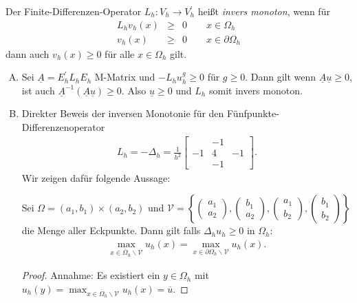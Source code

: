 \begin{Definition}
    \label{def:2.7}
    Der Finite-Differenzen-Operator $L_h \colon V_h \rightarrow V_h^\prime$
    heißt \emph{invers monoton}, wenn für
    \begin{eqnarray*}
        L_h v_h(x) &\ge& 0 \qquad x \in \Omega_h \\
        v_h(x) &\ge& 0 \qquad x \in \partial \Omega_h
    \end{eqnarray*}
    dann auch $v_h(x) \ge 0$ für alle $x \in \Omega_h$ gilt.
\end{Definition}


\begin{Beispiel}
    \begin{enumerate}[A)]
	\item
	    Sei $\underline A = E_h^\prime L_h E_h$ M-Matrix und $-L_h u_h^g
	    \ge 0$ für $g \ge 0$. Dann gilt wenn $\underline A
	    \underline u \ge 0$, ist auch $\underline A^{-1}
	    (\underline A \underline u) \ge 0$. Also $\underline u \ge
	    0$ und $L_h$ somit invers monoton.
	\item
	    Direkter Beweis der inversen Monotonie für den
        Fünfpunkte-Differenzenoperator
	    \begin{eqnarray*}
            L_h = -\Delta_h = \frac{1}{h^2}
                  \begin{bmatrix}
                      & -1 & \\
                      -1 & 4 & -1 \\
                      & -1 &
                  \end{bmatrix}.
	    \end{eqnarray*}
        Wir zeigen dafür folgende Aussage:

	    Sei $\Omega = (a_1, b_1) \times (a_2, b_2)$ und
	      $\mathcal{V}
	    = \left\{\left(\begin{smallmatrix} a_1 \\ a_2 \end{smallmatrix}\right),
            \left(\begin{smallmatrix} b_1 \\ a_2 \end{smallmatrix}\right),
            \left(\begin{smallmatrix} a_1 \\ b_2 \end{smallmatrix}\right),
            \left(\begin{smallmatrix} b_1 \\ b_2 \end{smallmatrix}\right)
          \right\}$ die Menge aller Eckpunkte.
	    Dann gilt falls $\Delta_h u_h \ge 0$ in $\Omega_h$:
	    \begin{eqnarray*}
            \max_{x \in \overline \Omega_h \backslash \mathcal{V}} u_h(x) =
            \max_{x \in \partial \Omega_h \backslash \mathcal{V}} u_h(x).
	    \end{eqnarray*}
	    \begin{proof}
            Annahme: Es existiert ein $y \in \Omega_h$ mit $u_h(y) =
            \max_{x \in \overline \Omega_h \backslash \mathcal{V}} u_h(x)
            = \overline u$.


\end{proof}
\end{enumerate}
\end{Beispiel}
